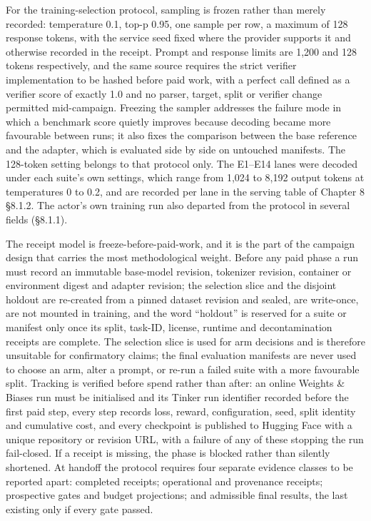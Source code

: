 \documentclass[12pt,a4paper]{report}
\begin{document}
For the training-selection protocol, sampling is frozen rather than
merely recorded: temperature 0.1, top-p 0.95, one sample per row, a
maximum of 128 response tokens, with the service seed fixed where the
provider supports it and otherwise recorded in the receipt. Prompt and
response limits are 1,200 and 128 tokens respectively, and the same
source requires the strict verifier implementation to be hashed before
paid work, with a perfect call defined as a verifier score of exactly
1.0 and no parser, target, split or verifier change permitted
mid-campaign. Freezing the sampler addresses the failure mode in which a
benchmark score quietly improves because decoding became more favourable
between runs; it also fixes the comparison between the base reference
and the adapter, which is evaluated side by side on untouched manifests.
The 128-token setting belongs to that protocol only. The E1--E14 lanes
were decoded under each suite's own settings, which range from 1,024 to
8,192 output tokens at temperatures 0 to 0.2, and are recorded per lane
in the serving table of Chapter 8 §8.1.2. The actor's own training run
also departed from the protocol in several fields (§8.1.1).

The receipt model is freeze-before-paid-work, and it is the part of the
campaign design that carries the most methodological weight. Before any
paid phase a run must record an immutable base-model revision, tokenizer
revision, container or environment digest and adapter revision; the
selection slice and the disjoint holdout are re-created from a pinned
dataset revision and sealed, are write-once, are not mounted in
training, and the word ``holdout'' is reserved for a suite or manifest
only once its split, task-ID, license, runtime and decontamination
receipts are complete. The selection slice is used for arm decisions and
is therefore unsuitable for confirmatory claims; the final evaluation
manifests are never used to choose an arm, alter a prompt, or re-run a
failed suite with a more favourable split. Tracking is verified before
spend rather than after: an online Weights \& Biases run must be
initialised and its Tinker run identifier recorded before the first paid
step, every step records loss, reward, configuration, seed, split
identity and cumulative cost, and every checkpoint is published to
Hugging Face with a unique repository or revision URL, with a failure of
any of these stopping the run fail-closed. If a receipt is missing, the
phase is blocked rather than silently shortened. At handoff the protocol
requires four separate evidence classes to be reported apart: completed
receipts; operational and provenance receipts; prospective gates and
budget projections; and admissible final results, the last existing only
if every gate passed.
\end{document}
